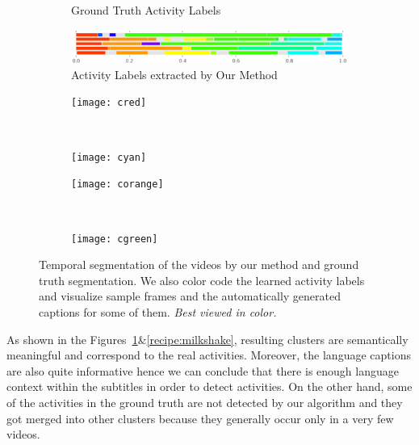 \begin{figure}
\begin{subfigure}[b]{0.5\textwidth}
\caption{Ground Truth Activity Labels}
\end{subfigure}
\begin{subfigure}[b]{0.5\textwidth}
\includegraphics[width=\textwidth]{act_our_2}
\caption{Activity Labels extracted by Our Method}
\end{subfigure}
\begin{subfigure}[b]{0.25\textwidth}
\texttt{[image: cred]}
\color[HTML]{FF3800}{Crack the eggs one at a time into a bowl.}
\end{subfigure}~
\begin{subfigure}[b]{0.25\textwidth}
\texttt{[image: cyan]}
\color[HTML]{00FFED}{Remove the omelet onto a plate.}
\end{subfigure}
\begin{subfigure}[b]{0.25\textwidth}
\texttt{[image: corange]}
\color[HTML]{FF9900}{You can either use a fork or wire whisk to beat the eggs into a bowl.}
\end{subfigure}~
\begin{subfigure}[b]{0.25\textwidth}
\texttt{[image: cgreen]}
\color[HTML]{9DFF00}{Eggs cook quickly, so make sure the pan gets very hot first; the butter melt completely.}
\end{subfigure}
\caption{Temporal segmentation of the videos by our method and ground truth segmentation. We also color code the learned activity labels and visualize sample frames and the automatically generated captions for some of them. \emph{Best viewed in color.}}
\label{recipe:ommelette}
\fi
\end{figure}

As shown in the Figures~\ref{recipe:ommelette}\&\ref{recipe:milkshake}, resulting clusters are semantically meaningful and correspond to the real activities. Moreover, the language captions are also quite informative hence we can conclude that there is enough language context within the subtitles in order to detect activities. On the other hand, some of the activities in the ground truth are not detected by our algorithm and they got merged into other clusters because they generally occur only in a very few videos.
